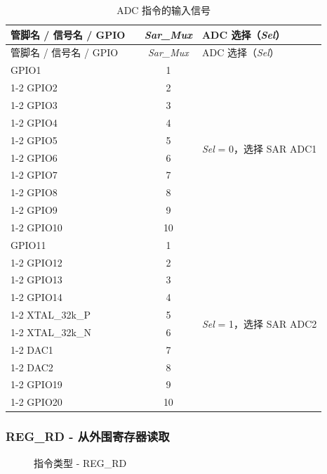 \documentclass[main\_\_CN.tex]{subfiles}
\begin{document}
\begin{longtable}{ |p{3.5cm}|c|p{4cm}| }
    \caption{ADC 指令的输入信号}
    \label{table:adc inputs1}
    \\\hline
    \rowcolor{lightgray}
    管脚名 / 信号名 / GPIO \ & \textit{Sar\_Mux} & ADC 选择（\textit{Sel}） \\\hline
    \endfirsthead
    \hline
    \rowcolor{lightgray}
    管脚名 / 信号名 / GPIO \ & \textit{Sar\_Mux} & ADC 选择（\textit{Sel}） \\\hline
    \endhead
    \hline
    \endfoot
    GPIO1    &  1  & \multirow{10}{*}{\textit{Sel} = 0，选择 SAR ADC1} \\ \cline{1-2}
    GPIO2  &  2  & \\ \cline{1-2}
    GPIO3  &  3  & \\ \cline{1-2}
    GPIO4  &  4  & \\ \cline{1-2}
    GPIO5  &  5  & \\ \cline{1-2}
    GPIO6  &  6  & \\ \cline{1-2}
    GPIO7  &  7  & \\ \cline{1-2}
    GPIO8  &  8  & \\ \cline{1-2}
    GPIO9  &  9  & \\ \cline{1-2}
    GPIO10  &  10  & \\ \hline
    GPIO11  &  1  & \multirow{10}{*}{\textit{Sel} = 1，选择 SAR ADC2 } \\ \cline{1-2}
    GPIO12  &  2  & \\ \cline{1-2}
    GPIO13  &  3  & \\ \cline{1-2}
    GPIO14  &  4  & \\ \cline{1-2}
    XTAL\_32k\_P  &  5  & \\ \cline{1-2}
    XTAL\_32k\_N  &  6  & \\ \cline{1-2}
    DAC1  &  7  & \\ \cline{1-2}
    DAC2  &  8  & \\ \cline{1-2}
    GPIO19  &  9  & \\ \cline{1-2}
    GPIO20                 &  10  &
\end{longtable}



\subsubsection {REG\_RD - 从外围寄存器读取} \label{subsection:REG_RD}

%
%
%
%
%
\begin{figure}[!ht]
    \centering
    \caption{指令类型 - REG\_RD}
    \label{figure:REG_RD}
\end{figure}
\end{document}

